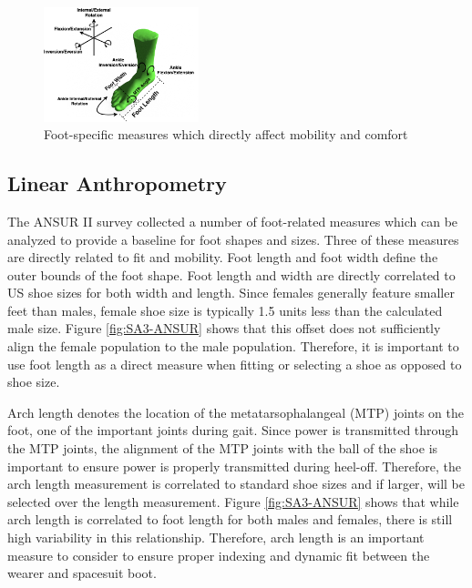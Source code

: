 \documentclass[defaultstyle,11pt]{comps}
\begin{document}
\begin{figure}
\hypertarget{fig:SA3-Foot}{%
\centering
\includegraphics[width=0.4\textwidth,height=\textheight]{../fig/SA3/FootOverview.png}
\caption{Foot-specific measures which directly affect mobility and comfort}\label{fig:SA3-Foot}
}
\end{figure}

\hypertarget{linear-anthropometry}{%
\subsection{Linear Anthropometry}\label{linear-anthropometry}}

The ANSUR II survey collected a number of foot-related measures which can be analyzed to provide a baseline for foot shapes and sizes\citep{Gordon2014}.
Three of these measures are directly related to fit and mobility.
Foot length and foot width define the outer bounds of the foot shape.
Foot length and width are directly correlated to US shoe sizes for both width and length.
Since females generally feature smaller feet than males, female shoe size is typically 1.5 units less than the calculated male size.
Figure \ref{fig:SA3-ANSUR} shows that this offset does not sufficiently align the female population to the male population.
Therefore, it is important to use foot length as a direct measure when fitting or selecting a shoe as opposed to shoe size.

Arch length denotes the location of the metatarsophalangeal (MTP) joints on the foot, one of the important joints during gait.
Since power is transmitted through the MTP joints, the alignment of the MTP joints with the ball of the shoe is important to ensure power is properly transmitted during heel-off.
Therefore, the arch length measurement is correlated to standard shoe sizes and if larger, will be selected over the length measurement.
Figure \ref{fig:SA3-ANSUR} shows that while arch length is correlated to foot length for both males and females, there is still high variability in this relationship.
Therefore, arch length is an important measure to consider to ensure proper indexing and dynamic fit between the wearer and spacesuit boot.
\end{document}
